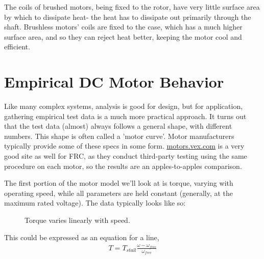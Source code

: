 \documentclass[10pt,letterpaper]{book}
\begin{document}
The coils of brushed motors, being fixed to the rotor, have very little surface area by which to dissipate heat- the heat has to dissipate out primarily through the shaft. Brushless motors' coils are fixed to the case, which has a much higher surface area, and so they can reject heat better, keeping the motor cool and efficient.

\newpage
\section{Empirical DC Motor Behavior}

Like many complex systems, analysis is good for design, but for application, gathering empirical test data is a much more practical approach. It turns out that the test data (almost) always follows a general shape, with different numbers. This shape is often called a 'motor curve'. Motor manufacturers typically provide some of these specs in some form. \href{http://motors.vex.com}{\color{red}\underline{motors.vex.com}} is a very good site as well for FRC, as they conduct third-party testing using the same procedure on each motor, so the results are an apples-to-apples comparison.


The first portion of the motor model we'll look at is torque, varying with operating speed, while all parameters are held constant (generally, at the maximum rated voltage). The data typically looks like so:

\begin{figure}[H] \centering \label{fig:motor_torque_curve}
\caption{Torque varies linearly with speed.}
\end{figure}

This could be expressed as an equation for a line,
\begin{align} \label{eq:motor_torque_curve}
  T = T_{stall} \frac{\omega-\omega_{free}}{\omega_{free}}
\end{align}
\end{document}

